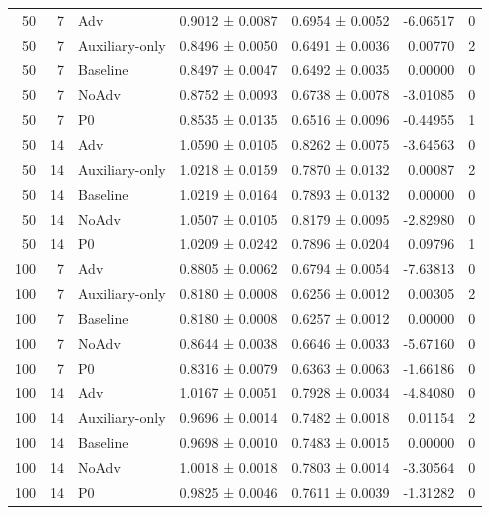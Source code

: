\begin{table}
\begin{tabular}{rrlllrr}
50 & 7 & Adv & 0.9012 ± 0.0087 & 0.6954 ± 0.0052 & -6.06517 & 0 \\
50 & 7 & Auxiliary-only & 0.8496 ± 0.0050 & 0.6491 ± 0.0036 & 0.00770 & 2 \\
50 & 7 & Baseline & 0.8497 ± 0.0047 & 0.6492 ± 0.0035 & 0.00000 & 0 \\
50 & 7 & NoAdv & 0.8752 ± 0.0093 & 0.6738 ± 0.0078 & -3.01085 & 0 \\
50 & 7 & P0 & 0.8535 ± 0.0135 & 0.6516 ± 0.0096 & -0.44955 & 1 \\
50 & 14 & Adv & 1.0590 ± 0.0105 & 0.8262 ± 0.0075 & -3.64563 & 0 \\
50 & 14 & Auxiliary-only & 1.0218 ± 0.0159 & 0.7870 ± 0.0132 & 0.00087 & 2 \\
50 & 14 & Baseline & 1.0219 ± 0.0164 & 0.7893 ± 0.0132 & 0.00000 & 0 \\
50 & 14 & NoAdv & 1.0507 ± 0.0105 & 0.8179 ± 0.0095 & -2.82980 & 0 \\
50 & 14 & P0 & 1.0209 ± 0.0242 & 0.7896 ± 0.0204 & 0.09796 & 1 \\
100 & 7 & Adv & 0.8805 ± 0.0062 & 0.6794 ± 0.0054 & -7.63813 & 0 \\
100 & 7 & Auxiliary-only & 0.8180 ± 0.0008 & 0.6256 ± 0.0012 & 0.00305 & 2 \\
100 & 7 & Baseline & 0.8180 ± 0.0008 & 0.6257 ± 0.0012 & 0.00000 & 0 \\
100 & 7 & NoAdv & 0.8644 ± 0.0038 & 0.6646 ± 0.0033 & -5.67160 & 0 \\
100 & 7 & P0 & 0.8316 ± 0.0079 & 0.6363 ± 0.0063 & -1.66186 & 0 \\
100 & 14 & Adv & 1.0167 ± 0.0051 & 0.7928 ± 0.0034 & -4.84080 & 0 \\
100 & 14 & Auxiliary-only & 0.9696 ± 0.0014 & 0.7482 ± 0.0018 & 0.01154 & 2 \\
100 & 14 & Baseline & 0.9698 ± 0.0010 & 0.7483 ± 0.0015 & 0.00000 & 0 \\
100 & 14 & NoAdv & 1.0018 ± 0.0018 & 0.7803 ± 0.0014 & -3.30564 & 0 \\
100 & 14 & P0 & 0.9825 ± 0.0046 & 0.7611 ± 0.0039 & -1.31282 & 0 \\
\bottomrule
\end{tabular}
\end{table}
